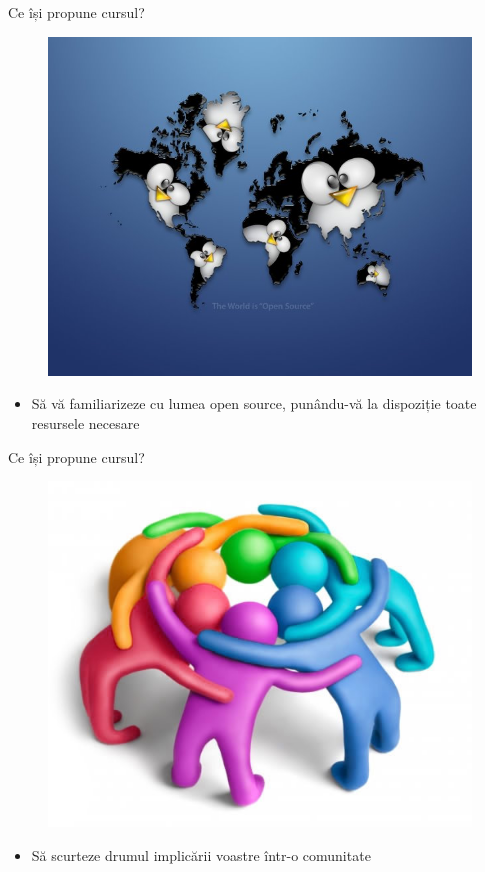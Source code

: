 \documentclass{beamer}
\begin{document}
\begin{frame}{Ce își propune cursul?}
  \begin{figure}
    \includegraphics[scale=0.3]{img/open_source_world.jpg}
  \end{figure}

  \begin{itemize} %
  \item Să vă familiarizeze cu lumea open source, punându-vă la dispoziție toate resursele necesare
  \end{itemize}
\end{frame}

\begin{frame}{Ce își propune cursul?}
  \begin{figure}
    \includegraphics[scale=0.4]{img/community.jpg}
  \end{figure}

  \begin{itemize}
  \item Să scurteze drumul implicării voastre într-o comunitate
  \end{itemize}
\end{frame}
\end{document}
